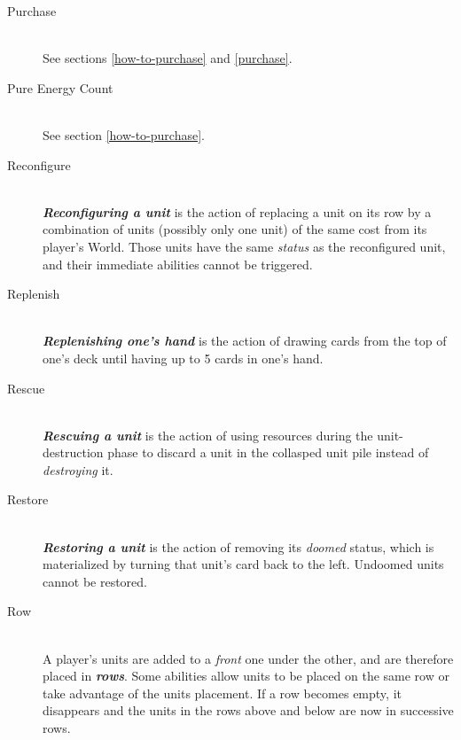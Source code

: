 \documentclass[a4paper]{article}
\begin{document}
\begin{description}
        \item[Purchase] \hfill \\
            See sections \ref{how-to-purchase} and \ref{purchase}.
            
        \item[Pure Energy Count] \hfill \\
            See section \ref{how-to-purchase}.
            
        \item[Reconfigure] \hfill \\
            \textbf{\textit{Reconfiguring a unit}} is the action of replacing a unit
            on its row by a combination of units (possibly only one unit)
            of the same cost from its player's World.
            Those units have the same \textit{status} as the reconfigured unit,
            and their immediate abilities cannot be triggered.
            
        \item[Replenish] \hfill \\
            \textbf{\textit{Replenishing one's hand}} is the action of drawing
            cards from the top of one's deck until having up to 5 cards in one's hand.
            
        \item[Rescue] \hfill \\
            \textbf{\textit{Rescuing a unit}} is the action of using resources
            during the unit-destruction phase to discard a unit in the collasped unit
            pile instead of \textit{destroying} it.
            
        \item[Restore] \hfill \\
            \textbf{\textit{Restoring a unit}} is the action of removing
            its \textit{doomed} status, which is materialized by turning
            that unit's card back to the left.
            Undoomed units cannot be restored.
            
        \item[Row] \hfill \\
            A player's units are added to a \textit{front} one under the other,
            and are therefore placed in \textbf{\textit{rows}}.
            Some abilities allow units to be placed on the same row or
            take advantage of the units placement.
            If a row becomes empty, it disappears and the units in the rows
            above and below are now in successive rows.
            

\end{description}
\end{document}
